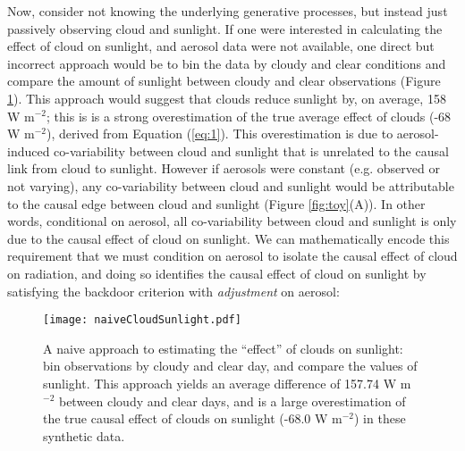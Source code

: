 \documentclass[12pt]{article}
\begin{document}
Now, consider not knowing the underlying generative processes, but
instead just passively observing cloud and sunlight. If one were
interested in calculating the effect of cloud on sunlight, and aerosol
data were not available, one direct but incorrect approach would be to bin the data
by cloudy and clear conditions and compare the amount of sunlight
between cloudy and clear observations (Figure
\ref{fig:naive-cloud-sunlight}). This approach would suggest that
clouds reduce sunlight by, on average, 158 W m$^{-2}$; this is is a
strong overestimation of the true average effect of clouds (-68 W
m$^{-2}$), derived from Equation (\ref{eq:1}). This overestimation is
due to aerosol-induced co-variability between cloud and sunlight that
is unrelated to the causal link from cloud to sunlight. However if
aerosols were constant (e.g. observed or not varying), any
co-variability between cloud and sunlight would be attributable to the
causal edge between cloud and sunlight (Figure \ref{fig:toy}(A)). In
other words, conditional on aerosol, all co-variability between cloud
and sunlight is only due to the causal effect of cloud on sunlight.
We can mathematically encode this requirement that we must condition
on aerosol to isolate the causal effect of cloud on radiation, and
doing so identifies the causal effect of cloud on sunlight by
satisfying the backdoor criterion with \textit{adjustment} on aerosol:

\begin{figure} \texttt{[image: naiveCloudSunlight.pdf]}
  \caption{A naive approach to estimating the ``effect'' of clouds on
    sunlight: bin observations by cloudy and clear day, and compare the
    values of sunlight. This approach yields an average difference of
    157.74 W m$^{-2}$ between cloudy and clear days, and is a large
    overestimation of the true causal effect of clouds on sunlight (-68.0
    W m$^{-2}$) in these synthetic data.}
  \label{fig:naive-cloud-sunlight}
\end{figure}
\end{document}
